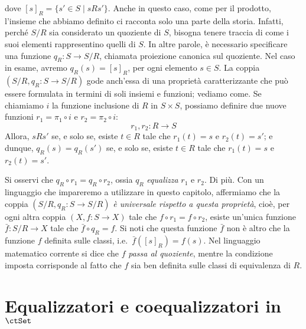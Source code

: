 dove \([s]_R=\{s'\in S\mid sRs'\}\). Anche in questo caso, come per il prodotto, l'insieme che abbiamo definito ci racconta solo una parte della storia. Infatti, perché \(S/R\) sia considerato un quoziente di \(S\), bisogna tenere traccia di come i suoi elementi rappresentino quelli di \(S\). In altre parole, è necessario specificare una funzione \(q_R\colon S\to S/R\),  chiamata proiezione canonica sul quoziente. Nel caso in esame, avremo \(q_R(s)=[s]_R\), per ogni elemento \(s\in S\). La coppia \((S/R, q_R\colon S\to S/R)\) gode anch'essa di una proprietà caratterizzante che può essere formulata in termini di soli insiemi e funzioni; vediamo come.  Se chiamiamo \(i\) la funzione inclusione di \(R\) in \(S\times  S\), possiamo definire due nuove funzioni \(r_1=\pi_1\circ i\) e \(r_2=\pi_2\circ i\):
\[
	r_1, r_2\colon R\to S
\]
Allora, \(s R s'\) se, e solo se, esiste \(t\in R\) tale che \(r_1(t)=s\) e \(r_2(t)=s'\); e dunque, \(q_R(s)=q_R(s')\) se, e solo se, esiste \(t\in R\) tale che \(r_1(t)=s\) e \(r_2(t)=s'\).

Si osservi che \(q_R\circ r_1=q_R\circ r_2 \), ossia \(q_R\) \emph{equalizza} \(r_1\) e \(r_2\). Di più. Con un linguaggio che impareremo a utilizzare in questo capitolo, affermiamo che la coppia \((S/R,q_R\colon S\to S/R)\) \emph{è universale rispetto a questa proprietà}, cioè, per ogni altra coppia \((X,f\colon S\to X)\) tale che  \(f\circ r_1=f\circ r_2 \), esiste un'unica funzione \(\bar f\colon S/R\to X\) tale che \(\bar f\circ q_R= f\). Si noti che questa funzione \(\bar f\) non è altro che la funzione \(f\) definita sulle classi, i.e.\ \(\bar f([s]_R)= f(s)\). Nel linguaggio matematico corrente si dice che \(f\) \emph{passa al quoziente}, mentre la condizione imposta corrisponde al fatto che \(f\) sia ben definita sulle classi di equivalenza di \(R\).
\begin{esercizi}
	\item
	\item
	\item
	\item
	\item
\end{esercizi}
\section{Equalizzatori e coequalizzatori in \(\ctSet\)}
\Todo{}
\begin{esercizi}
	\item
	\item
	\item
	\item
	\item
\end{esercizi}
